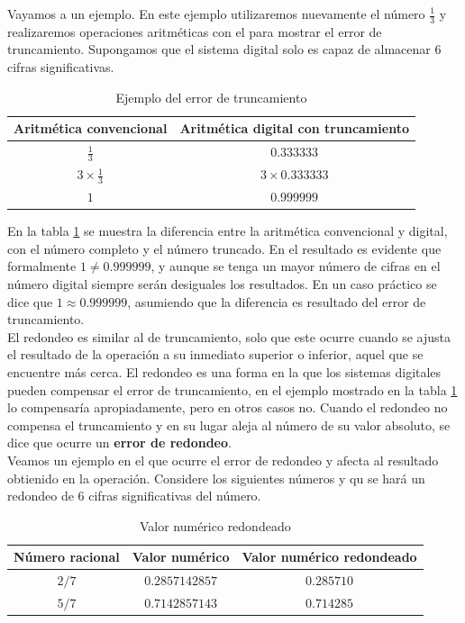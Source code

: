 Vayamos a un ejemplo. En este ejemplo utilizaremos nuevamente el número $\frac{1}{3}$ y realizaremos operaciones aritméticas con el para mostrar el 
error de truncamiento. Supongamos que el sistema digital solo es capaz de almacenar 6 cifras significativas.

\begin{table}[H]
	\centering
	\begin{tabular}{cc}
		\toprule
		\textbf{Aritmética convencional} & \textbf{Aritmética digital con truncamiento}\\
		\midrule
		$\frac{1}{3}$ & $0.333333$\\
		$3\times\frac{1}{3}$ & $3\times 0.333333$\\
		$1$ & $0.999999$	\\	
		\bottomrule
	\end{tabular}
	\caption{Ejemplo del error de truncamiento}
	\label{table:errorTruncamiento}
\end{table}

En la tabla \ref{table:errorTruncamiento} se muestra la diferencia entre la aritmética convencional y digital, con el número completo y el número truncado. 
En el resultado es evidente que  formalmente $1\not= 0.999999$, y aunque se tenga un mayor número de cifras en el número digital siempre serán desiguales 
los resultados. En un caso práctico se dice que $1\approx 0.999999$, asumiendo que la diferencia es resultado del error de truncamiento.\\

El redondeo es similar al de truncamiento, solo que este ocurre cuando se ajusta el resultado de la operación a su inmediato superior o inferior, aquel que se
encuentre más cerca. El redondeo es una forma en la que los sistemas digitales pueden compensar el error de truncamiento, en el ejemplo mostrado en la tabla 
\ref{table:errorTruncamiento} lo compensaría apropiadamente, pero en otros casos no. Cuando el redondeo no compensa el truncamiento y en su lugar aleja al 
número de su valor absoluto, se dice que ocurre un \textbf{error de redondeo}. \\

Veamos un ejemplo en el que ocurre el error de redondeo y afecta al resultado obtienido en la operación. Considere los siguientes números y qu se hará
un redondeo de 6 cifras significativas del número.

\begin{table}[H]
	\centering
	\begin{tabular}{ccc}
		\toprule
		\textbf{Número racional} & \textbf{Valor numérico} & \textbf{Valor numérico redondeado}\\
		\midrule
		$2/7$ & $0.2857142857$ & $0.285710$\\
		$5/7$ & $0.7142857143$ & $0.714285$	\\
		\bottomrule
	\end{tabular}
	\caption{Valor numérico redondeado}
	\label{table:errorRedondeo}
\end{table}

